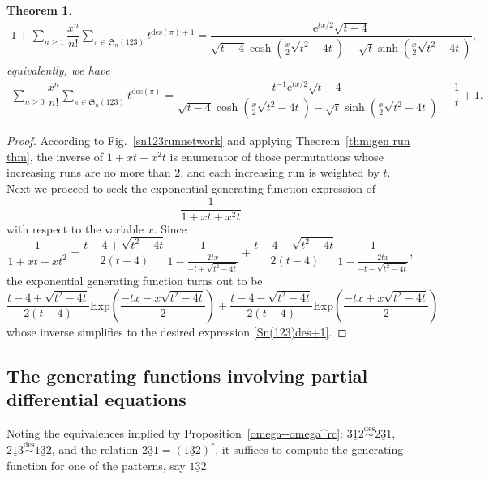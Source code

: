 \documentclass[11pt,reqno]{amsart}
\numberwithin{equation}{section}
\theoremstyle{plain}
\newtheorem{theorem}{Theorem}[section]
\theoremstyle{definition}
\renewcommand{\S}{\mathfrak{S}}
\def\des{\mathrm{des}}
\begin{document}
\begin{theorem}
\begin{align}\label{Sn(123)des+1}
1+\sum_{n\geq 1}\dfrac{x^n}{n!}\sum_{\pi \in \S_n(\underline{123})} t^{\mathrm{des}(\pi)+1}=\dfrac{\mathrm{e}^{tx/2}\sqrt{t-4}}{\sqrt{t-4}\cosh {\left(\frac{x}{2}\sqrt{t^2-4t}\right)}-\sqrt{t}\sinh{\left(\frac{x}{2}\sqrt{t^2-4t}\right)}},
\end{align}
equivalently, we have
\begin{align}\label{Sn(123)des}
	\sum_{n\geq 0}\dfrac{x^n}{n!}\sum_{\pi \in \S_n(\underline{123})} t^{\mathrm{des}(\pi)}=\dfrac{t^{-1}\mathrm{e}^{tx/2}\sqrt{t-4}}{\sqrt{t-4}\cosh {\left(\frac{x}{2}\sqrt{t^2-4t}\right)}-\sqrt{t}\sinh{\left(\frac{x}{2}\sqrt{t^2-4t}\right)}}-\dfrac{1}{t}+1.
\end{align}
\end{theorem}

\begin{proof}
According to Fig.~\ref{sn123runnetwork} and applying Theorem~\ref{thm:gen run thm}, the inverse of $1+xt+x^2t$ is enumerator of those permutations whose increasing runs are no more than 2, and each increasing run is weighted by $t$. Next we proceed to seek the exponential generating function expression of $$\frac{1}{1+xt+x^2t}$$ with respect to the variable $x$. Since 
$$\dfrac{1}{1+xt+xt^2}=\dfrac{t-4+\sqrt{t^2-4t}}{2\left(t-4\right)}\dfrac{1}{1-\frac{2tx}{-t+\sqrt{t^2-4t}}}+\dfrac{t-4-\sqrt{t^2-4t}}{2(t-4)}\dfrac{1}{1-\frac{2tx}{-t-\sqrt{t^2-4t}}},$$ 
the exponential generating function turns out to be 
$$\frac{t-4+\sqrt{t^2-4t}}{2\left(t-4\right)} \mathrm{Exp}\left(\frac{-tx-x\sqrt{t^2-4t}}{2}\right)+\frac{t-4-\sqrt{t^2-4t}}{2\left(t-4\right)} \mathrm{Exp}\left(\frac{-tx+x\sqrt{t^2-4t}}{2}\right)$$
whose inverse simplifies to the desired expression \eqref{Sn(123)des+1}.
\end{proof}











\subsection{The generating functions involving partial differential equations} \label{subsec:g.f.132}
Noting the equivalences implied by Proposition~\ref{omega--omega^rc}: $\underline{312} \overset{\des}{\sim }\underline{231} $, $\underline{213} \overset{\des}{\sim }\underline{132}$, and the relation $\underline{231}=(\underline{132})^r$, it suffices to compute the generating function for one of the patterns, say $\underline{132}$.
\end{document}
